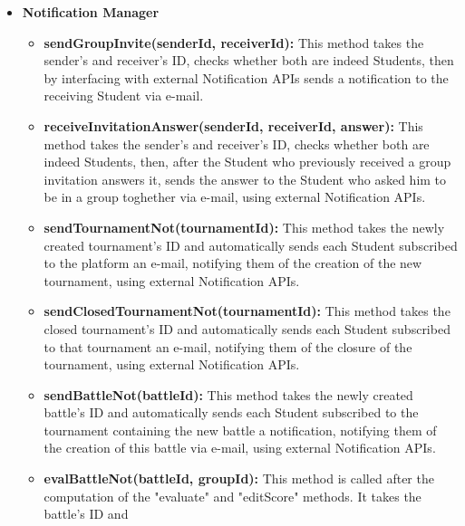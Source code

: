 \documentclass{article}
\begin{document}
{\begin{itemize}
\begin{itemize}
        This method will also be invoked once when a battle is being closed, so that badges will be granted also on the last commits made by each group.
        \item \textbf{getBadges(userId):} This methods takes the user's ID, checks if the user is a Student by interacting with the DBMS and, 
        if the user is indeed a Student, returns all the badges he achieved while using the platform.
        If the user is not a Student or an error occurs while interacting with the DBMS, an error page will be displayed.
    \end{itemize}
    \item \textbf{Notification Manager}
    \begin{itemize}
        \item \textbf{sendGroupInvite(senderId, receiverId):} This method takes the sender's and receiver's ID, checks whether both are indeed Students, then by interfacing 
        with external Notification APIs sends a notification to the receiving Student via e-mail.
        \item \textbf{receiveInvitationAnswer(senderId, receiverId, answer):} This method takes the sender's and receiver's ID, checks whether both are indeed Students, then,
        after the Student who previously received a group invitation answers it, sends the answer to the Student who asked him to be in a group toghether via e-mail, using
        external Notification APIs.
        \item \textbf{sendTournamentNot(tournamentId):} This method takes the newly created tournament's ID and automatically sends each Student subscribed to the platform an 
        e-mail, notifying them of the creation of the new tournament, using external Notification APIs. 
        \item \textbf{sendClosedTournamentNot(tournamentId):} This method takes the closed tournament's ID and automatically sends each Student subscribed to that tournament
        an e-mail, notifying them of the closure of the tournament, using external Notification APIs.
        \item \textbf{sendBattleNot(battleId):} This method takes the newly created battle's ID and automatically sends each Student subscribed to the tournament containing the 
        new battle a notification, notifying them of the creation of this battle via e-mail, using external Notification APIs.
        \item \textbf{evalBattleNot(battleId, groupId):} This method is called after the computation of the "evaluate" and "editScore" methods. It takes the battle's ID and 

\end{itemize}
\end{itemize}}
\end{document}
